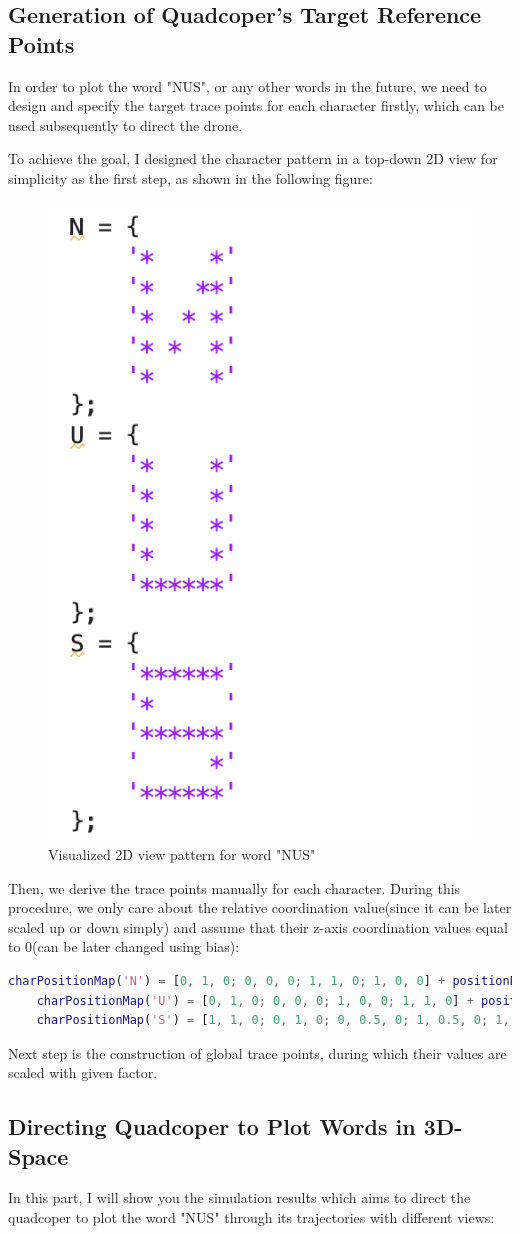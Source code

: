 \documentclass[12pt]{article}
\begin{document}
\subsection{Generation of Quadcoper's Target Reference Points}
In order to plot the word "NUS", or any other words in the future, we need to design and specify the target trace points for each character firstly, which can be used subsequently to direct the drone.

To achieve the goal, I designed the character pattern in a top-down 2D view for simplicity as the first step, as shown in the following figure:
\begin{figure}[H]
    \centering
    \includegraphics[width=.2\linewidth]{figures/nus_word_pattern}
    \caption{Visualized 2D view pattern for word "NUS" }
    \label{fig:nus_word_pattern}
\end{figure}

Then, we derive the trace points manually for each character. During this procedure, we only care about the relative coordination value(since it can be later scaled up or down simply) and assume that their z-axis coordination values equal to 0(can be later changed using bias):
\begin{lstlisting}[language=Matlab, basicstyle=\tiny]
    charPositionMap('N') = [0, 1, 0; 0, 0, 0; 1, 1, 0; 1, 0, 0] + positionBias;
    charPositionMap('U') = [0, 1, 0; 0, 0, 0; 1, 0, 0; 1, 1, 0] + positionBias;
    charPositionMap('S') = [1, 1, 0; 0, 1, 0; 0, 0.5, 0; 1, 0.5, 0; 1, 0, 0; 0, 0, 0] + positionBias;
\end{lstlisting}

Next step is the construction of global trace points, during which their values are scaled with given factor.


\subsection{Directing Quadcoper to Plot Words in 3D-Space}
In this part, I will show you the simulation results which aims to direct the quadcoper to plot the word "NUS" through its trajectories with different views:
\end{document}
